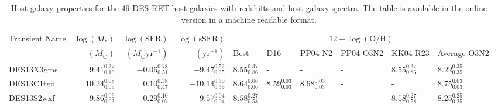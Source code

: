\documentclass[fleqn,usenatbib,]{mnras}
\begin{document}
\begin{table}

\caption{Host galaxy properties for the 49 DES RET host galaxies with redshifts and host galaxy spectra. The table is available in the online version in a machine readable format.}
\begin{threeparttable}
\begin{tabular}{lrrrllllll}
\toprule
Transient Name &$\log \left(M_*\right)$ &$\log \left(\mathrm{SFR}\right)$ &  $\log \left(\mathrm{sSFR}\right)$ &                                                           \multicolumn{6}{c}{$12+\log\left(\mathrm{O/H}\right) $}\\
{} & $\left( M_{\odot}\right)$ & $\left(M_{\odot} \mathrm{yr}^{-1}\right)$&$\left(\mathrm{yr}^{-1} \right)$& Best\tnote{a} &                                                           D16 &                                                       PP04 N2 &                                                     PP04 O3N2 &                                                      KK04 R23 &                                                   Average O3N2\tnote{b}\\
\midrule
DES13X3gms &   $9.41 _{\scriptscriptstyle 0.16} ^{\scriptscriptstyle 0.27}$ &  $-0.06 _{\scriptscriptstyle 0.51} ^{\scriptscriptstyle 0.78}$ &   $-9.47 _{\scriptscriptstyle 0.35} ^{\scriptscriptstyle 0.52}$ &  $8.55 _{\scriptscriptstyle 0.86} ^{\scriptscriptstyle 0.37}$ &                                                             - &                                                             - &                                                             - &  $8.55 _{\scriptscriptstyle 0.86} ^{\scriptscriptstyle 0.37}$ &   $8.22 _{\scriptscriptstyle 0.35} ^{\scriptscriptstyle 0.35}$ \\
DES13C1tgd &  $10.24 _{\scriptscriptstyle 0.09} ^{\scriptscriptstyle 0.08}$ &   $0.10 _{\scriptscriptstyle 0.47} ^{\scriptscriptstyle 0.38}$ &  $-10.14 _{\scriptscriptstyle 0.39} ^{\scriptscriptstyle 0.30}$ &  $8.64 _{\scriptscriptstyle 0.06} ^{\scriptscriptstyle 0.06}$ &  $8.59 _{\scriptscriptstyle 0.03} ^{\scriptscriptstyle 0.03}$ &  $8.68 _{\scriptscriptstyle 0.03} ^{\scriptscriptstyle 0.03}$ &                                                             - &                                                             - &   $8.75 _{\scriptscriptstyle 0.03} ^{\scriptscriptstyle 0.03}$ \\
DES13S2wxf &   $9.86 _{\scriptscriptstyle 0.03} ^{\scriptscriptstyle 0.06}$ &   $0.29 _{\scriptscriptstyle 0.07} ^{\scriptscriptstyle 0.10}$ &   $-9.57 _{\scriptscriptstyle 0.04} ^{\scriptscriptstyle 0.04}$ &  $8.58 _{\scriptscriptstyle 0.58} ^{\scriptscriptstyle 0.27}$ &                                                             - &                                                             - &                                                             - &  $8.58 _{\scriptscriptstyle 0.58} ^{\scriptscriptstyle 0.27}$ &   $8.25 _{\scriptscriptstyle 0.25} ^{\scriptscriptstyle 0.25}$ \\

\end{tabular}
\end{threeparttable}
\end{table}
\end{document}
